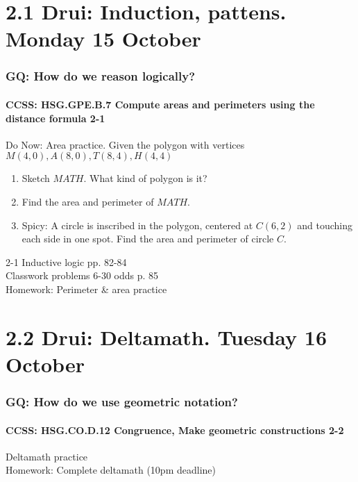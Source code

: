 \documentclass{beamer}
\begin{document}
\section{2.1 Drui: Induction, pattens. Monday 15 October}
  \frame
  {
    \frametitle{GQ: How do we reason logically?}
    \framesubtitle{CCSS: HSG.GPE.B.7 Compute areas and perimeters using the distance formula  \alert{2-1}}

    \begin{block}{Do Now: Area practice. Given the polygon with vertices $M(4,0), A(8,0), T(8,4), H(4,4)$}
    \begin{enumerate}
        \item Sketch $MATH$. What kind of polygon is it?
        \item Find the area and perimeter of $MATH$.
        \item Spicy: A circle is inscribed in the polygon, centered at $C(6,2)$ and touching each side in one spot. Find the area and perimeter of circle $C$.
    \end{enumerate}
    \end{block}
    2-1 Inductive logic  pp. 82-84\\
    Classwork problems 6-30 odds p. 85\\
    \vspace{0.5cm}
    Homework: Perimeter \& area practice
  }

\section{2.2 Drui: Deltamath. Tuesday 16 October}
  \frame
  {
    \frametitle{GQ: How do we use geometric notation?}
    \framesubtitle{CCSS: HSG.CO.D.12 Congruence, Make geometric constructions  \alert{2-2}}

    Deltamath practice\\ \bigskip
    Homework: Complete deltamath (10pm deadline)
  }
\end{document}
